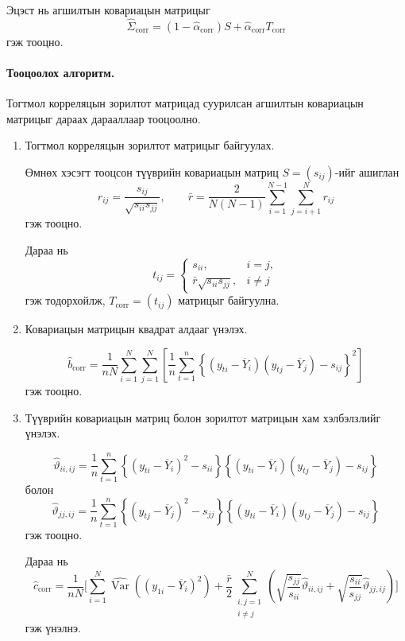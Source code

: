 Эцэст нь агшилтын ковариацын
матрицыг
\[
\widehat{\Sigma}_{\mathrm{corr}}
=
(1-\widehat{\alpha}_{\mathrm{corr}})S
+
\widehat{\alpha}_{\mathrm{corr}}
T_{\mathrm{corr}}
\]
гэж тооцно.

\paragraph{Тооцоолох алгоритм.}

Тогтмол корреляцын зорилтот матрицад
суурилсан агшилтын ковариацын матрицыг
дараах дарааллаар тооцоолно.

\begin{enumerate}
	\item Тогтмол корреляцын зорилтот
	матрицыг байгуулах.
	
	Өмнөх хэсэгт тооцсон түүврийн
	ковариацын матриц $S=(s_{ij})$-ийг
	ашиглан
	\[
	r_{ij}
	=
	\frac{s_{ij}}{\sqrt{s_{ii}s_{jj}}},
	\qquad
	\bar r
	=
	\frac{2}{N(N-1)}
	\sum_{i=1}^{N-1}
	\sum_{j=i+1}^{N}r_{ij}
	\]
	гэж тооцно.
	
	Дараа нь
	\[
	t_{ij}
	=
	\begin{cases}
		s_{ii}, & i=j,\\
		\bar r\sqrt{s_{ii}s_{jj}}, & i\neq j
	\end{cases}
	\]
	гэж тодорхойлж,
	$T_{\mathrm{corr}}=(t_{ij})$
	матрицыг байгуулна.
	
	\item Ковариацын матрицын
	квадрат алдааг үнэлэх.
	
	\[
	\widehat b_{\mathrm{corr}}
	=
	\frac{1}{nN}
	\sum_{i=1}^{N}\sum_{j=1}^{N}
	\left[
	\frac{1}{n}
	\sum_{t=1}^{n}
	\left\{
	(y_{ti}-\overline{Y}_i)
	(y_{tj}-\overline{Y}_j)-s_{ij}
	\right\}^2
	\right]
	\]
	гэж тооцно.
	
	\item Түүврийн ковариацын матриц
	болон зорилтот матрицын
	хам хэлбэлзлийг үнэлэх.
	
	\[
	\widehat{\vartheta}_{ii,ij}
	=
	\frac{1}{n}
	\sum_{t=1}^{n}
	\left\{
	(y_{ti}-\overline{Y}_i)^2-s_{ii}
	\right\}
	\left\{
	(y_{ti}-\overline{Y}_i)
	(y_{tj}-\overline{Y}_j)-s_{ij}
	\right\}
	\]
	болон
	\[
	\widehat{\vartheta}_{jj,ij}
	=
	\frac{1}{n}
	\sum_{t=1}^{n}
	\left\{
	(y_{tj}-\overline{Y}_j)^2-s_{jj}
	\right\}
	\left\{
	(y_{ti}-\overline{Y}_i)
	(y_{tj}-\overline{Y}_j)-s_{ij}
	\right\}
	\]
	гэж тооцно.
	
	Дараа нь
	\[
		\widehat c_{\mathrm{corr}}
		=
		\frac{1}{nN}
		\Bigg[
		\sum_{i=1}^{N}
		\widehat{\operatorname{Var}}
		\left((y_{1i}-\overline{Y}_i)^2\right)+
		\frac{\bar r}{2}
		\sum_{\substack{i,j=1\\i\neq j}}^{N}
		\left(
		\sqrt{\frac{s_{jj}}{s_{ii}}}
		\widehat{\vartheta}_{ii,ij}
		+
		\sqrt{\frac{s_{ii}}{s_{jj}}}
		\widehat{\vartheta}_{jj,ij}
		\right)
		\Bigg]
	\]
	гэж үнэлнэ.
	

\end{enumerate}
